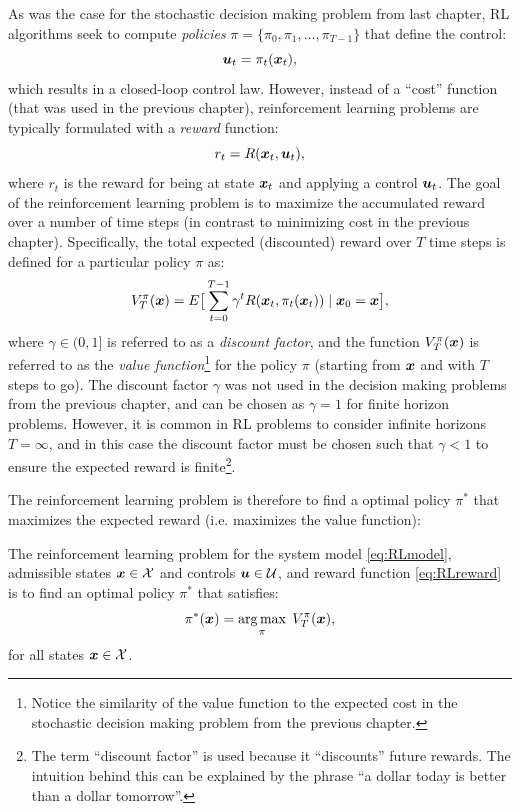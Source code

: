 As was the case for the stochastic decision making problem from last chapter, RL algorithms seek to compute \textit{policies} $\pi = \{\pi_0, \pi_1, \dots, \pi_{T-1}\}$ that define the control:
\begin{equation} \label{eq:RLpolicy}
\bm{u}_t = \pi_t(\bm{x}_t),
\end{equation}
which results in a closed-loop control law.
However, instead of a ``cost'' function (that was used in the previous chapter), reinforcement learning problems are typically formulated with a \textit{reward} function:
\begin{equation} \label{eq:RLreward}
r_t = R(\bm{x}_t, \bm{u}_t),
\end{equation}
where $r_t$ is the reward for being at state $\bm{x}_t$ and applying a control $\bm{u}_t$. The goal of the reinforcement learning problem is to maximize the accumulated reward over a number of time steps (in contrast to minimizing cost in the previous chapter). Specifically, the total expected (discounted) reward over $T$ time steps is defined for a particular policy $\pi$ as:
\begin{equation} \label{eq:RLvalue}
V_T^\pi(\bm{x}) = E\big[\sum_{t=0}^{T-1} \gamma^tR(\bm{x}_t, \pi_t(\bm{x}_t)) \mid \bm{x}_0 = \bm{x} \big],
\end{equation}
where $\gamma \in (0,1]$ is referred to as a \textit{discount factor}, and the function $V_T^\pi(\bm{x})$ is referred to as the \textit{value function}\footnote{Notice the similarity of the value function to the expected cost in the stochastic decision making problem from the previous chapter.} for the policy $\pi$ (starting from $\bm{x}$ and with $T$ steps to go). The discount factor $\gamma$ was not used in the decision making problems from the previous chapter, and can be chosen as $\gamma = 1$ for finite horizon problems. However, it is common in RL problems to consider infinite horizons $T = \infty$, and in this case the discount factor must be chosen such that $\gamma < 1$ to ensure the expected reward is finite\footnote{The term ``discount factor'' is used because it ``discounts'' future rewards. The intuition behind this can be explained by the phrase ``a dollar today is better than a dollar tomorrow''.}. 

The reinforcement learning problem is therefore to find a optimal policy $\pi^*$ that maximizes the expected reward (i.e. maximizes the value function):
\begin{definition}
The reinforcement learning problem for the system model \eqref{eq:RLmodel}, admissible states $\bm{x} \in \mathcal{X}$ and controls $\bm{u} \in \mathcal{U}$, and reward function \eqref{eq:RLreward} is to find an optimal policy $\pi^*$ that satisfies:
\begin{equation} \label{eq:rlproblem}
\pi^*(\bm{x}) = \underset{\pi}{\arg\max} \:\: V_T^\pi(\bm{x}),
\end{equation}
for all states $\bm{x} \in \mathcal{X}$.
\end{definition}



